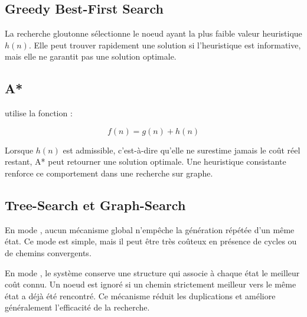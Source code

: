 \subsection{Greedy Best-First Search}

La recherche gloutonne sélectionne le noeud ayant la plus faible valeur
heuristique $h(n)$. Elle peut trouver rapidement une solution si l'heuristique
est informative, mais elle ne garantit pas une solution optimale.

\subsection{A*}

\AStar{} utilise la fonction :

\[
f(n) = g(n) + h(n)
\]

Lorsque $h(n)$ est admissible, c'est-à-dire qu'elle ne surestime jamais le coût
réel restant, A* peut retourner une solution optimale. Une heuristique
consistante renforce ce comportement dans une recherche sur graphe.

\subsection{Tree-Search et Graph-Search}

En mode \TreeSearch{}, aucun mécanisme global n'empêche la génération répétée
d'un même état. Ce mode est simple, mais il peut être très coûteux en présence
de cycles ou de chemins convergents.

En mode \GraphSearch{}, le système conserve une structure  qui
associe à chaque état le meilleur coût connu. Un noeud est ignoré si un chemin
strictement meilleur vers le même état a déjà été rencontré. Ce mécanisme réduit
les duplications et améliore généralement l'efficacité de la recherche.